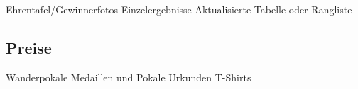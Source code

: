 Ehrentafel/Gewinnerfotos
Einzelergebnisse
Aktualisierte Tabelle oder Rangliste  

\subsection{Preise}
\label{turniere:ergebnisse:preise}

Wanderpokale
Medaillen und Pokale
Urkunden
T-Shirts





